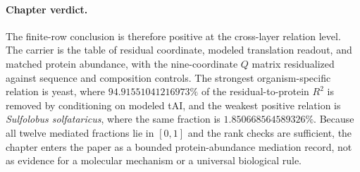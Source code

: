\paragraph{Chapter verdict.}
The finite-row conclusion is therefore positive at the cross-layer relation level. The carrier is the table of residual coordinate, modeled translation readout, and matched protein abundance, with the nine-coordinate $Q$ matrix residualized against sequence and composition controls. The strongest organism-specific relation is yeast, where $94.91551041216973\%$ of the residual-to-protein $R^2$ is removed by conditioning on modeled tAI, and the weakest positive relation is \emph{Sulfolobus solfataricus}, where the same fraction is $1.850668564589326\%$. Because all twelve mediated fractions lie in $[0,1]$ and the rank checks are sufficient, the chapter enters the paper as a bounded protein-abundance mediation record, not as evidence for a molecular mechanism or a universal biological rule.
